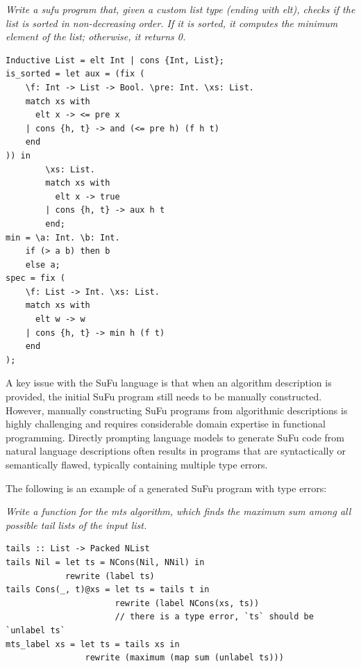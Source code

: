 \documentclass[manuscript,screen]{acmart}
\begin{document}
 \begin{tcolorbox}[
    enhanced,
    breakable,
    colback=gray!5,
    colframe=black,
    boxrule=0.5pt,
    arc=2pt,
    left=8pt,
    right=8pt,
    top=8pt,
    bottom=8pt,
    title=Example SuFu Prompt
]
\textit{\color{revblue}Write a sufu program that, given a custom list type (ending with elt), checks if the list is sorted in non-decreasing order. If it is sorted, it computes the minimum element of the list; otherwise, it returns 0.}
\begin{Verbatim}[fontsize=\small, xleftmargin=1em]
Inductive List = elt Int | cons {Int, List};
is_sorted = let aux = (fix (
    \f: Int -> List -> Bool. \pre: Int. \xs: List.
    match xs with
      elt x -> <= pre x
    | cons {h, t} -> and (<= pre h) (f h t)
    end
)) in
        \xs: List.
        match xs with
          elt x -> true
        | cons {h, t} -> aux h t
        end;
min = \a: Int. \b: Int.
    if (> a b) then b
    else a;
spec = fix (
    \f: List -> Int. \xs: List.
    match xs with
      elt w -> w
    | cons {h, t} -> min h (f t)
    end
);
\end{Verbatim}
\end{tcolorbox}

 A key issue with the SuFu language is that when an algorithm description is provided, the initial SuFu program still needs to be manually constructed.
However, manually constructing SuFu programs from algorithmic descriptions is highly challenging and requires considerable domain expertise in functional programming. 
Directly prompting language models to generate SuFu code from natural language descriptions often results in programs that are syntactically or semantically flawed, typically containing multiple type errors. 

The following is an example of    {\color{revblue}a generated SuFu program } with type errors:
\begin{tcolorbox}[
    colback=gray!5,
    colframe=black,
    boxrule=0.5pt,
    arc=2pt,
    left=8pt,
    right=8pt,
    top=8pt,
    bottom=8pt,
    title=Natural Language Prompt
]
\textit{Write a function for the mts algorithm, which finds the maximum sum among all possible tail lists of the input list.}
\end{tcolorbox}
\begin{tcolorbox}[
    colback=gray!5,
    colframe=black,
    boxrule=0.5pt,
    arc=2pt
]
\begin{Verbatim}[fontsize=\small, xleftmargin=1em]
tails :: List -> Packed NList
tails Nil = let ts = NCons(Nil, NNil) in
            rewrite (label ts)
tails Cons(_, t)@xs = let ts = tails t in
                      rewrite (label NCons(xs, ts))
                      // there is a type error, `ts` should be `unlabel ts`
mts_label xs = let ts = tails xs in
                rewrite (maximum (map sum (unlabel ts)))
\end{Verbatim}
\end{tcolorbox}
\end{document}
